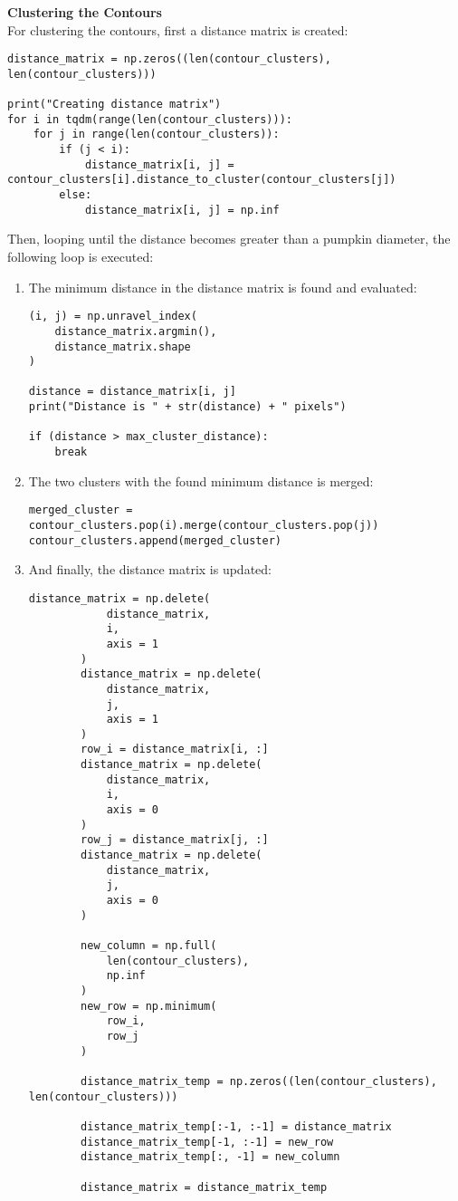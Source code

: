 \documentclass[../Head/Main.tex]{subfiles}
\begin{document}
\textbf{Clustering the Contours}\\
For clustering the contours, first a distance matrix is created:
\begin{verbatim}
distance_matrix = np.zeros((len(contour_clusters), len(contour_clusters)))

print("Creating distance matrix")
for i in tqdm(range(len(contour_clusters))):
    for j in range(len(contour_clusters)):
        if (j < i):
            distance_matrix[i, j] = contour_clusters[i].distance_to_cluster(contour_clusters[j])
        else:
            distance_matrix[i, j] = np.inf
\end{verbatim}
Then, looping until the distance becomes greater than a pumpkin diameter, the following loop is executed:
\begin{enumerate}
\item The minimum distance in the distance matrix is found and evaluated:
\begin{verbatim}
(i, j) = np.unravel_index(
	distance_matrix.argmin(),
    distance_matrix.shape
)

distance = distance_matrix[i, j]
print("Distance is " + str(distance) + " pixels")

if (distance > max_cluster_distance):
	break
\end{verbatim}
\item The two clusters with the found minimum distance is merged:
\begin{verbatim}
merged_cluster = contour_clusters.pop(i).merge(contour_clusters.pop(j))
contour_clusters.append(merged_cluster)
\end{verbatim}
\item And finally, the distance matrix is updated:
\begin{verbatim}
distance_matrix = np.delete(
            distance_matrix,
            i,
            axis = 1
        )
        distance_matrix = np.delete(
            distance_matrix,
            j,
            axis = 1
        )
        row_i = distance_matrix[i, :]
        distance_matrix = np.delete(
            distance_matrix,
            i,
            axis = 0
        )
        row_j = distance_matrix[j, :]
        distance_matrix = np.delete(
            distance_matrix,
            j,
            axis = 0
        )

        new_column = np.full(
            len(contour_clusters),
            np.inf
        )
        new_row = np.minimum(
            row_i,
            row_j
        )

        distance_matrix_temp = np.zeros((len(contour_clusters), len(contour_clusters)))

        distance_matrix_temp[:-1, :-1] = distance_matrix
        distance_matrix_temp[-1, :-1] = new_row
        distance_matrix_temp[:, -1] = new_column

        distance_matrix = distance_matrix_temp
\end{verbatim}
\end{enumerate}
\end{document}
